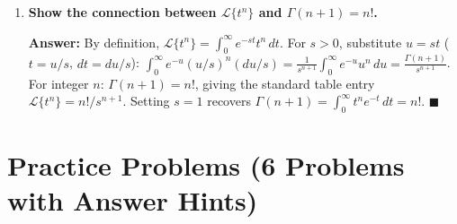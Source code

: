 \documentclass[12pt,a4paper]{article}
\begin{document}
\begin{enumerate}[label=\textbf{(\arabic*)}, leftmargin=*, itemsep=1.2em]
\textbf{Answer:}
Strategy 2 states: if $\mathcal{L}\{f(t)\} = F(s)$, then
$\mathcal{L}\{f(t)/t\} = \int_s^\infty F(u)\,du$.
Setting $s = 0$: $\int_0^\infty f(t)/t\,dt = \int_0^\infty F(u)\,du$.

\textbf{Example:} Evaluate $\int_0^\infty (\sin 2t)/t\,dt$.
$\mathcal{L}\{\sin 2t\} = 2/(s^2+4)$.
$\int_s^\infty 2/(u^2+4)\,du = 2\cdot \frac{1}{2}\arctan(u/2)\Big|_s^\infty
= [\arctan(u/2)]_s^\infty = \pi/2 - \arctan(s/2)$.
Set $s = 0$: $\int_0^\infty (\sin 2t)/t\,dt = \pi/2$. \hfill $\blacksquare$

\item \textbf{Show the connection between $\mathcal{L}\{t^n\}$ and
      $\Gamma(n+1) = n!$.}

\textbf{Answer:}
By definition, $\mathcal{L}\{t^n\} = \int_0^\infty e^{-st} t^n\,dt$.
For $s > 0$, substitute $u = st$ ($t = u/s$, $dt = du/s$):
$\int_0^\infty e^{-u}(u/s)^n(du/s) = \frac{1}{s^{n+1}}\int_0^\infty e^{-u} u^n\,du
= \frac{\Gamma(n+1)}{s^{n+1}}$.
For integer $n$: $\Gamma(n+1) = n!$, giving the standard table entry
$\mathcal{L}\{t^n\} = n!/s^{n+1}$.
Setting $s = 1$ recovers $\Gamma(n+1) = \int_0^\infty t^n e^{-t}\,dt = n!$. \hfill $\blacksquare$

\end{enumerate}

\section{Practice Problems (6 Problems with Answer Hints)}
\end{document}
